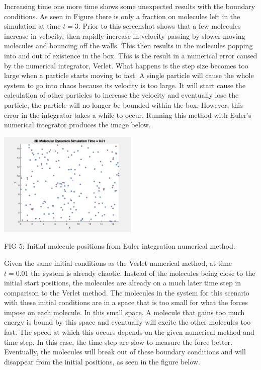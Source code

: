 \documentclass[reprint,amsmath,amssymb, aps, 10pt, a4paper, english, reqno]{revtex4-1}
\begin{document}
\begin{multicols}{2}
Increasing time one more time shows some unexpected results with the boundary conditions. As seen in Figure there is only a fraction on molecules left in the simulation at time $t = 3$. Prior to this screenshot shows that a few molecules increase in velocity, then rapidly increase in velocity passing by slower moving molecules and bouncing off the walls. This then results in the molecules popping into and out of existence in the box. This is the result in a numerical error caused by the numerical integrator, Verlet. What happens is the step size becomes too large when a particle starts moving to fast. A single particle will cause the whole system to go into chaos because its velocity is too large. It will start cause the calculation of other particles to increase the velocity and eventually lose the particle, the particle will no longer be bounded within the box. However, this error in the integrator takes a while to occur. Running this method with Euler's numerical integrator produces the image below. 

\begin{center}
    \includegraphics[width=0.50\textwidth]{position_n_289_t_0_bc_euler.png}
    \caption{\small FIG 5: Initial molecule positions from Euler integration numerical method.}
\end{center}

Given the same initial conditions as the Verlet numerical method, at time $t = 0.01$ the system is already chaotic. Instead of the molecules being close to the initial start positions, the molecules are already on a much later time step in comparison to the Verlet method. The molecules in the system for this scenario with these initial conditions are in a space that is too small for what the forces impose on each molecule. In this small space. A molecule that gains too much energy is bound by this space and eventually will excite the other molecules too fast. The speed at which this occurs depends on the given numerical method and time step. In this case, the time step are slow to measure the force better. Eventually, the molecules will break out of these boundary conditions and will disappear from the initial positions, as seen in the figure below. 


\end{multicols}
\end{document}
